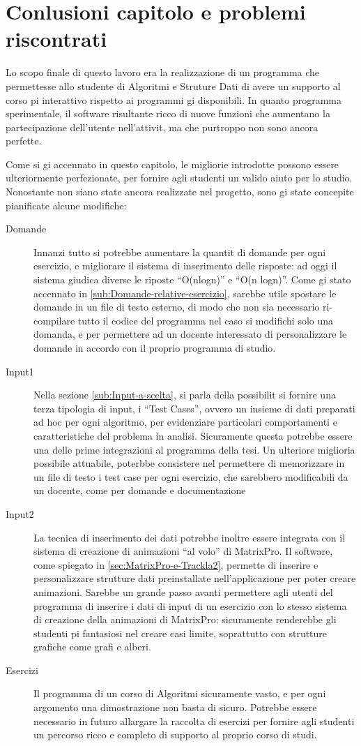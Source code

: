 \section{Conlusioni capitolo e problemi riscontrati}

Lo scopo finale di questo lavoro era la realizzazione di un programma
che permettesse allo studente di Algoritmi e Struture Dati di avere
un supporto al corso pi interattivo rispetto ai programmi gi disponibili.
In quanto programma sperimentale, il software risultante  ricco di
nuove funzioni che aumentano la partecipazione dell'utente nell'attivit,
ma che purtroppo non sono ancora perfette.

Come si  gi accennato in questo capitolo, le migliorie introdotte
possono essere ulteriormente perfezionate, per fornire agli studenti
un valido aiuto per lo studio. Nonostante non siano state ancora realizzate
nel progetto, sono gi state concepite pianificate alcune modifiche:
\begin{description}
\item [{Domande}] Innanzi tutto si potrebbe aumentare la quantit di domande
per ogni esercizio, e migliorare il sistema di inserimento delle risposte:
ad oggi il sistema giudica diverse le riposte {}``O(nlogn)'' e {}``O(n
logn)''. Come  gi stato accennato in \ref{sub:Domande-relative-esercizio},
sarebbe utile spostare le domande in un file di testo esterno, di
modo che non sia necessario ri-compilare tutto il codice del programma
nel caso si modifichi solo una domanda, e per permettere ad un docente
interessato di personalizzare le domande in accordo con il proprio
programma di studio.
\item [{Input1}] Nella sezione \ref{sub:Input-a-scelta}, si parla della
possibilit si fornire una terza tipologia di input, i {}``Test Cases'',
ovvero un insieme di dati preparati ad hoc per ogni algoritmo, per
evidenziare particolari comportamenti e caratteristiche del problema
in analisi. Sicuramente questa potrebbe essere una delle prime integrazioni
al programma della tesi. Un ulteriore miglioria possibile attuabile,
poterbbe consistere nel permettere di memorizzare in un file di testo
i test case per ogni esercizio, che sarebbero modificabili da un docente,
come per domande e documentazione
\item [{Input2}] La tecnica di inserimento dei dati potrebbe inoltre essere
integrata con il sistema di creazione di animazioni {}``al volo''
di MatrixPro. Il software, come spiegato in \ref{sec:MatrixPro-e-Trackla2},
permette di inserire e personalizzare strutture dati preinstallate
nell'applicazione per poter creare animazioni. Sarebbe un grande passo
avanti permettere agli utenti del programma di inserire i dati di
input di un esercizio con lo stesso sistema di creazione della animazioni
di MatrixPro: sicuramente renderebbe gli studenti pi fantasiosi nel
creare casi limite, soprattutto con strutture grafiche come grafi
e alberi.
\item [{Esercizi}] Il programma di un corso di Algoritmi  sicuramente
vasto, e per ogni argomento una dimostrazione non basta di sicuro.
Potrebbe essere necessario in futuro allargare la raccolta di esercizi
per fornire agli studenti un percorso ricco e completo di supporto
al proprio corso di studi. 
\end{description}

